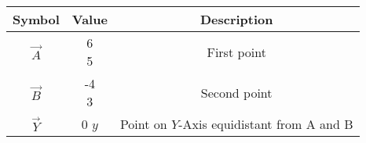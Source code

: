 \begin{tabular}[12pt]{ |c|c|c|}
    \hline
    \textbf{Symbol} & \textbf{Value} & \textbf{Description} \\
    \hline
    $\vec{A}$ & \myvec{6\\5} & First point\\
    \hline 
    $\vec{B}$ & \myvec{-4\\3} & Second point\\
    \hline
    $\vec{Y}$ & \myvec{0\\$y$} & Point on $Y$-Axis equidistant from A and B\\
    \hline
    \end{tabular}
